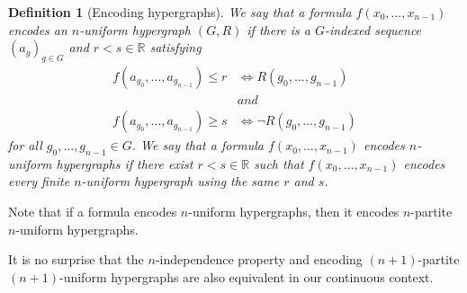 \documentclass{amsart}
\newtheorem{defin}[teor]{Definition}
\newtheorem{external claim}[teor]{Claim}
\begin{document}
\begin{defin}[Encoding hypergraphs] \label{def: encoding nonpartite}
    We say that a formula $f(x_0,\dots,x_{n-1})$ \emph{encodes an $n$-uniform hypergraph $(G,R)$} if there is a $G$-indexed sequence $(a_g)_{g\in G}$  and $r<s\in\mathbb{R}$ satisfying 
    \begin{align*}
        f( a_{g_0},\dots, a_{g_{n-1}}  )\leq r &\iff  R(g_0,\dots, g_{n-1})\\
        &and\\
        f(a_{g_0},\dots, a_{g_{n-1}}  )\geq s &\iff \neg R(g_0,\dots, g_{n-1})
    \end{align*}
    for all 
    $g_0,\dots,g_{n-1}\in G$.
    We say that a formula $f(x_0,\dots,x_{n-1})$ \emph{encodes $n$-uniform hypergraphs} if there exist $r<s\in\mathbb{R}$ such that $f(x_0,\dots,x_{n-1})$ encodes every finite $n$-uniform hypergraph using the same $r$ and $s$.
\end{defin}

Note that if a formula encodes $n$-uniform hypergraphs, then it encodes $n$-partite $n$-uniform hypergraphs. 

It is no surprise that the $n$-independence property and encoding $(n+1)$-partite $(n+1)$-uniform hypergraphs are also equivalent in our continuous context.
\end{document}
